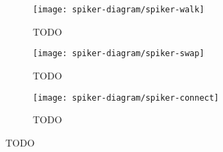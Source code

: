 \begin{figure*}[!htbp]
\begin{center}
\begin{subfigure}[b]{0.33\linewidth}
  \texttt{[image: spiker-diagram/spiker-walk]}
  \caption{TODO}
  \label{fig:TODO}
\end{subfigure}
\begin{subfigure}[b]{0.33\linewidth}
  \texttt{[image: spiker-diagram/spiker-swap]}
  \caption{TODO}
  \label{fig:TODO}
\end{subfigure}
\begin{subfigure}[b]{0.33\linewidth}
  \texttt{[image: spiker-diagram/spiker-connect]}
  \caption{TODO}
  \label{fig:TODO}
\end{subfigure}
\caption{
TODO
}
\label{fig:spiker_diagram}
\end{center}
\end{figure*}
